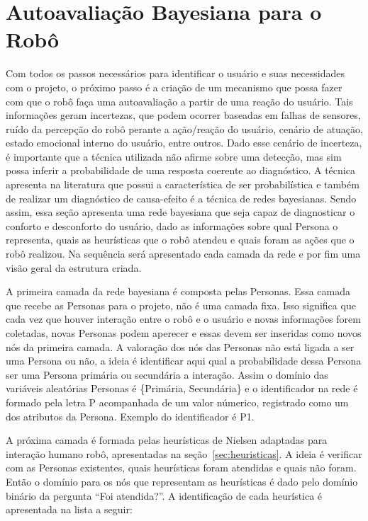 \section{Autoavaliação Bayesiana para o Robô}
\label{sec:rede-bayesiana}

Com todos os passos necessários para identificar o usuário e suas necessidades com o projeto, o próximo passo é a criação de um mecanismo que possa fazer com que o robô faça uma autoavaliação a partir de uma reação do usuário. Tais informações geram incertezas, que podem ocorrer baseadas em falhas de sensores, ruído da percepção do robô perante a ação/reação do usuário, cenário de atuação, estado emocional interno do usuário, entre outros. Dado esse cenário de incerteza, é importante que a técnica utilizada não afirme sobre uma detecção, mas sim possa inferir a probabilidade de uma resposta coerente ao diagnóstico. A técnica apresenta na literatura que possui a característica de ser probabilística e também de realizar um diagnóstico de causa-efeito é a técnica de redes bayesianas. Sendo assim, essa seção apresenta uma rede bayesiana que seja capaz de diagnosticar o conforto e desconforto do usuário, dado as informações sobre qual Persona o representa, quais as heurísticas que o robô atendeu e quais foram as ações que o robô realizou. Na sequência será apresentado cada camada da rede e por fim uma visão geral da estrutura criada.

A primeira camada da rede bayesiana é composta pelas Personas. Essa camada que recebe as Personas para o projeto, não é uma camada fixa. Isso significa que cada vez que houver interação entre o robô e o usuário e novas informações forem coletadas, novas Personas podem aperecer e essas devem ser inseridas como novos nós da primeira camada. A valoração dos nós das Personas não está ligada a ser uma Persona ou não, a ideia é identificar aqui qual a probabilidade dessa Persona ser uma Persona primária ou secundária a interação. Assim o domínio das variáveis aleatórias Personas é \{Primária, Secundária\} e o identificador na rede é formado pela letra P acompanhada de um valor númerico, registrado como um dos atributos da Persona. Exemplo do identificador é P1.

A próxima camada é formada pelas heurísticas de Nielsen adaptadas para interação humano robô, apresentadas na seção~\ref{sec:heuristicas}. A ideia é verificar com as Personas existentes, quais heurísticas foram atendidas e quais não foram. Então o domínio para os nós que representam as heurísticas é dado pelo domínio binário da pergunta ``Foi atendida?''. A identificação de cada heurística é apresentada na lista a seguir:

